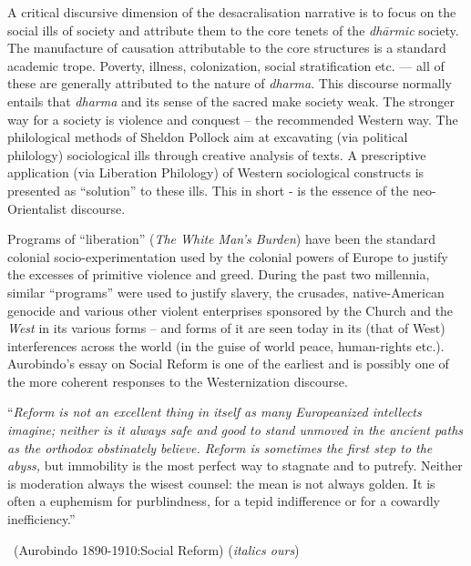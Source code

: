 A critical discursive dimension of the desacralisation narrative is to focus on the social ills of society and attribute them to the core tenets of the \textit{dhārmic} society. The manufacture of causation attributable to the core structures is a standard academic trope. Poverty, illness, colonization, social stratification etc. — all of these are generally attributed to the nature of \textit{dharma}. This discourse normally entails that \textit{dharma} and its sense of the sacred make society weak. The stronger way for a society is violence and conquest – the recommended Western way. The philological methods of Sheldon Pollock aim at excavating (via political philology) sociological ills through creative analysis of texts. A prescriptive application (via Liberation Philology) of Western sociological constructs is presented as “solution” to these ills. This in short - is the essence of the neo-Orientalist discourse.

Programs of “liberation” (\textit{The White Man's Burden}) have been the standard colonial socio-experimentation used by the colonial powers of Europe to justify the excesses of primitive violence and greed. During the past two millennia, similar “programs” were used to justify slavery, the crusades, native-American genocide and various other violent enterprises sponsored by the Church and the \textit{West} in its various forms – and forms of it are seen today in its (that of West) interferences across the world (in the guise of world peace, human-rights etc.). Aurobindo's essay on Social Reform is one of the earliest and is possibly one of the more coherent responses to the Westernization discourse.

\begin{myquote}
“\textit{Reform is not an excellent thing in itself as many Europeanized intellects imagine; neither is it always safe and good to stand unmoved in the ancient paths as the orthodox obstinately believe. Reform is sometimes the first step to the abyss,} but immobility is the most perfect way to stagnate and to putrefy. Neither is moderation always the wisest counsel: the mean is not always golden. It is often a euphemism for purblindness, for a tepid indifference or for a cowardly inefficiency.” 

~\hfill (Aurobindo 1890-1910:Social Reform) (\textit{italics ours})
\end{myquote}


